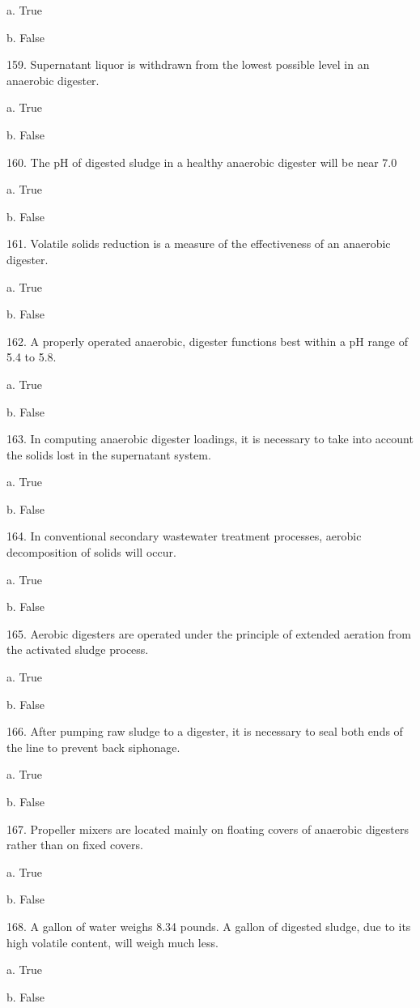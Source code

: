 \documentclass{article}
\begin{document}
a. True 

b. False 


159. Supernatant liquor is withdrawn from the lowest possible level in an anaerobic digester. 

a. True 

b. False 


160. The pH of digested sludge in a healthy anaerobic digester will be near 7.0 

a. True 

b. False 


161. Volatile solids reduction is a measure of the effectiveness of an anaerobic digester. 

a. True 

b. False 


162. A properly operated anaerobic, digester functions best within a pH range of 5.4 to 5.8. 

a. True 

b. False 


163. In computing anaerobic digester loadings, it is necessary to take into account the solids lost in the supernatant system. 

a. True 

b. False 


164. In conventional secondary wastewater treatment processes, aerobic decomposition of solids will occur. 

a. True 

b. False 


165. Aerobic digesters are operated under the principle of extended aeration from the activated sludge process. 

a. True 

b. False 


166. After pumping raw sludge to a digester, it is necessary to seal both ends of the line to prevent back siphonage. 

a. True 

b. False 


167. Propeller mixers are located mainly on floating covers of anaerobic digesters rather than on fixed covers. 

a. True 

b. False 


168. A gallon of water weighs 8.34 pounds. A gallon of digested sludge, due to its high volatile content, will weigh much less. 

a. True 

b. False 
\end{document}
